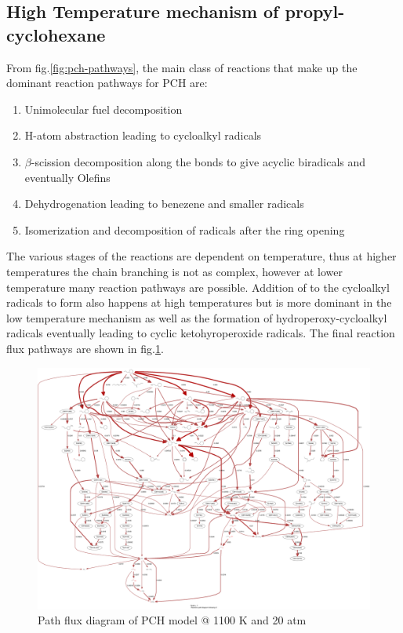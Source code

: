 \subsection{High Temperature mechanism of propyl-cyclohexane}
  From fig.\ref{fig:pch-pathways}, the main class of reactions that make up the dominant reaction pathways for PCH are:
  \begin{enumerate}
      \item Unimolecular fuel decomposition
      \item H-atom abstraction leading to cycloalkyl radicals
      \item $\beta$-scission decomposition along the  bonds to give acyclic biradicals and eventually Olefins
      \item Dehydrogenation leading to benezene and smaller radicals 
      \item Isomerization and decomposition of radicals after the ring opening
  \end{enumerate}

The various stages of the reactions are dependent on temperature, thus at higher temperatures the chain branching is not as complex, however at lower temperature many reaction pathways are possible. Addition of  to the cycloalkyl radicals to form  also happens at high temperatures but is more dominant in the low temperature mechanism as well as the formation of hydroperoxy-cycloalkyl radicals eventually leading to cyclic ketohyroperoxide radicals. The final reaction flux pathways are shown in fig.\ref{fig:pch-pfa}.


\begin{figure}
    \centering
    \includegraphics[scale=0.175, keepaspectratio]{images/pch-pfa.png}
    \caption{Path flux diagram of PCH model @ 1100 K and 20 atm}
    \label{fig:pch-pfa}
\end{figure}
\cleardoublepage
